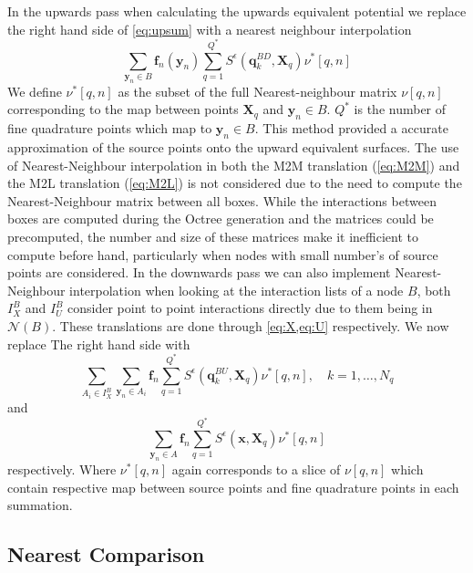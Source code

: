 In the upwards pass when calculating the upwards equivalent potential we replace the right hand side of \cref{eq:upsum} with a nearest neighbour interpolation
\begin{equation*}
    \sum_{{\bm{y}}_{n} \in B} \bm{f}_{n}({\bm{y}}_n) \sum_{q=1}^{Q^*}S^{\epsilon}\left({\bm{q}}^{BD}_{k}, {\bm{X}}_{q}\right) \nu^*[q,n]
\end{equation*}
We define $\nu^*[q,n]$ as the subset of the full Nearest-neighbour matrix $\nu[q,n]$ corresponding to the map between points ${\bm{X}}_{q}$ and ${\bm{y}}_{n} \in B$. $Q^*$ is the number of fine quadrature points which map to ${\bm{y}}_{n} \in B$. This method provided a accurate approximation of the source points onto the upward equivalent surfaces. The use of Nearest-Neighbour interpolation in both the M2M translation (\cref{eq:M2M}) and the M2L translation (\cref{eq:M2L}) is not considered due to the need to compute the Nearest-Neighbour matrix between all boxes. While the interactions between boxes are computed during the Octree generation and the matrices could be precomputed, the number and size of these matrices make it inefficient to compute before hand, particularly when nodes with small number's of source points are considered. 
In the downwards pass we can also implement Nearest-Neighbour interpolation when looking at the interaction lists of a node $B$, both $I_X^B$ and $I_U^B$ consider point to point interactions directly due to them being in $\mathcal{N}(B)$. These translations are done through \cref{eq:X,eq:U} respectively. We now replace The right hand side with 
\begin{equation*}
    \sum_{A_i \in I_X^B} \sum_{{\bm{y}}_n\in A_i} {\bm{f}}_{n} \sum_{q=1}^{Q^*} S^\epsilon\left(\bm{q}^{BU}_{k}, {\bm{X}}_{q}\right) \nu^*[q,n], \quad k=1,\dots,N_q
\end{equation*}
and
\begin{equation*}
    \sum_{{\bm{y}}_n\in A}{\bm{f}}_n \sum_{q=1}^{Q^*} S^\epsilon(\bm{x},{\bm{X}}_q) \nu^*[q,n]
\end{equation*}
respectively. Where $\nu^*[q,n]$ again corresponds to a slice of $\nu[q,n]$ which contain respective map between source points and fine quadrature points in each summation.

\subsection{Nearest Comparison}
